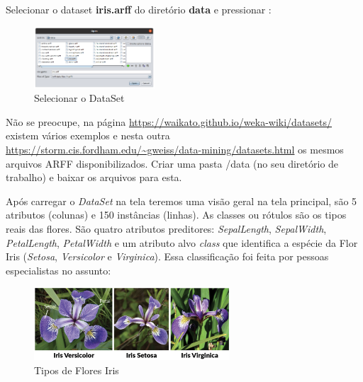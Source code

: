 \documentclass[a4paper,11pt]{article}
\begin{document}
Selecionar o dataset \textbf{iris.arff} do diretório \textbf{data} e pressionar :
\begin{figure}[H]
	\centering
	\includegraphics[width=0.4\textwidth]{imagem/arquivosARFF.png}
	\caption{Selecionar o DataSet}
\end{figure}

\begin{theo}{}
	Não se preocupe, na página \url{https://waikato.github.io/weka-wiki/datasets/} existem vários exemplos e nesta outra \url{https://storm.cis.fordham.edu/~gweiss/data-mining/datasets.html} os mesmos arquivos ARFF disponibilizados. Criar uma pasta /data (no seu diretório de trabalho) e baixar os arquivos para esta.
\end{theo}

Após carregar o \textit{DataSet} na tela teremos uma visão geral na tela principal, são 5 atributos (colunas) e 150 instâncias (linhas). As classes ou rótulos são os tipos reais das flores. São quatro atributos preditores: \textit{SepalLength}, \textit{SepalWidth}, \textit{PetalLength}, \textit{PetalWidth} e um atributo alvo \textit{class} que identifica a espécie da Flor Iris (\textit{Setosa}, \textit{Versicolor} e \textit{Virginica}). Essa classificação foi feita por pessoas especialistas no assunto:
\begin{figure}[H]
	\centering
	\includegraphics[width=0.65\textwidth]{imagem/iris.png}
	\caption{Tipos de Flores Iris}
\end{figure}
\end{document}
